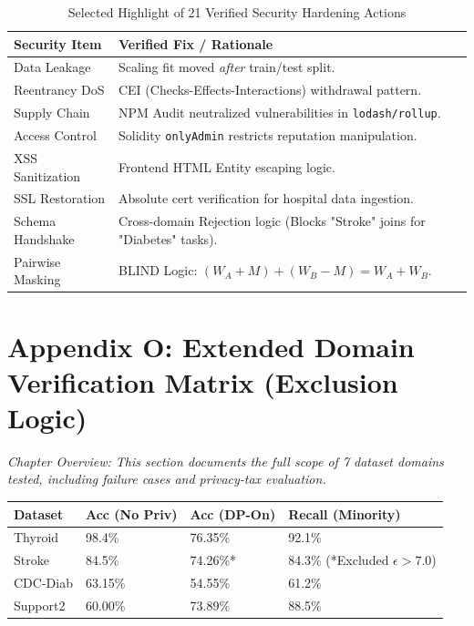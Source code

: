 \documentclass[10pt, a4paper, twocolumn]{article}
\begin{document}
\begin{table}[hbt!]
    \centering
    \begin{tabular}{@{}lp{10cm}@{}}
        \toprule
        \textbf{Security Item} & \textbf{Verified Fix / Rationale} \\ \midrule
        Data Leakage & Scaling fit moved \textit{after} train/test split. \\
        Reentrancy DoS & CEI (Checks-Effects-Interactions) withdrawal pattern. \\
        Supply Chain & NPM Audit neutralized vulnerabilities in \texttt{lodash/rollup}. \\
        Access Control & Solidity \texttt{onlyAdmin} restricts reputation manipulation. \\
        XSS Sanitization & Frontend HTML Entity escaping logic. \\
        SSL Restoration & Absolute cert verification for hospital data ingestion. \\
        Schema Handshake & Cross-domain Rejection logic (Blocks "Stroke" joins for "Diabetes" tasks). \\
        Pairwise Masking & BLIND Logic: $(W_A + M) + (W_B - M) = W_A + W_B$. \\ \bottomrule
    \end{tabular}
    \caption*{Selected Highlight of 21 Verified Security Hardening Actions}
\end{table}

\section*{Appendix O: Extended Domain Verification Matrix (Exclusion Logic)}
\textit{Chapter Overview: This section documents the full scope of 7 dataset domains tested, including failure cases and privacy-tax evaluation.}

\begin{table}[hbt!]
\centering
\begin{tabular}{@{}llll@{}}
\toprule
\textbf{Dataset} & \textbf{Acc (No Priv)} & \textbf{Acc (DP-On)} & \textbf{Recall (Minority)} \\ \midrule
Thyroid & 98.4\% & 76.35\% & 92.1\% \\
Stroke & 84.5\% & 74.26\%* & 84.3\% (*Excluded $\epsilon > 7.0$) \\
CDC-Diab & 63.15\% & 54.55\% & 61.2\% \\
Support2 & 60.00\% & 73.89\% & 88.5\% \\ \bottomrule
\end{tabular}
\end{table}
\end{document}
